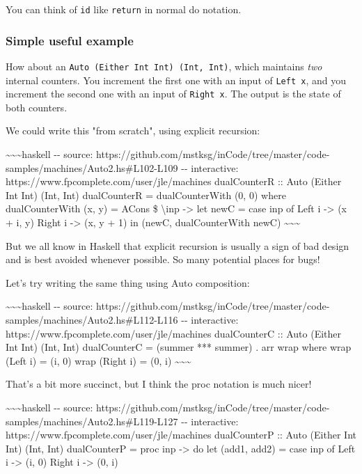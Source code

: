 \documentclass[]{article}
\begin{document}
You can think of \texttt{id} like \texttt{return} in normal do notation.

\subsubsection{Simple useful example}

How about an \texttt{Auto\ (Either\ Int\ Int)\ (Int,\ Int)}, which maintains
\emph{two} internal counters. You increment the first one with an input of
\texttt{Left\ x}, and you increment the second one with an input of
\texttt{Right\ x}. The output is the state of both counters.

We could write this "from scratch", using explicit recursion:

\textasciitilde{}\textasciitilde{}\textasciitilde{}haskell -\/- source:
https://github.com/mstksg/inCode/tree/master/code-samples/machines/Auto2.hs\#L102-L109
-\/- interactive: https://www.fpcomplete.com/user/jle/machines dualCounterR ::
Auto (Either Int Int) (Int, Int) dualCounterR = dualCounterWith (0, 0) where
dualCounterWith (x, y) = ACons \$ \textbackslash{}inp -\textgreater{} let newC =
case inp of Left i -\textgreater{} (x + i, y) Right i -\textgreater{} (x, y + 1)
in (newC, dualCounterWith newC)
\textasciitilde{}\textasciitilde{}\textasciitilde{}

But we all know in Haskell that explicit recursion is usually a sign of bad
design and is best avoided whenever possible. So many potential places for bugs!

Let's try writing the same thing using Auto composition:

\textasciitilde{}\textasciitilde{}\textasciitilde{}haskell -\/- source:
https://github.com/mstksg/inCode/tree/master/code-samples/machines/Auto2.hs\#L112-L116
-\/- interactive: https://www.fpcomplete.com/user/jle/machines dualCounterC ::
Auto (Either Int Int) (Int, Int) dualCounterC = (summer *** summer) . arr wrap
where wrap (Left i) = (i, 0) wrap (Right i) = (0, i)
\textasciitilde{}\textasciitilde{}\textasciitilde{}

That's a bit more succinct, but I think the proc notation is much nicer!

\textasciitilde{}\textasciitilde{}\textasciitilde{}haskell -\/- source:
https://github.com/mstksg/inCode/tree/master/code-samples/machines/Auto2.hs\#L119-L127
-\/- interactive: https://www.fpcomplete.com/user/jle/machines dualCounterP ::
Auto (Either Int Int) (Int, Int) dualCounterP = proc inp -\textgreater{} do let
(add1, add2) = case inp of Left i -\textgreater{} (i, 0) Right i -\textgreater{}
(0, i)
\end{document}
